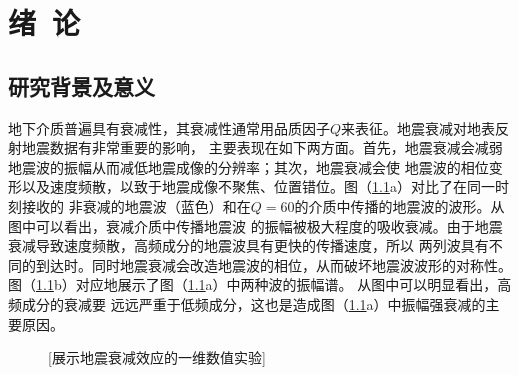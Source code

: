 


\newcommand{\citeA}[2]{\citeauthor{#1}\cite{#1}}

\chapter{绪~论}

\section{研究背景及意义}
地下介质普遍具有衰减性，其衰减性通常用品质因子$Q$来表征。地震衰减对地表反射地震数据有非常重要的影响，
主要表现在如下两方面。首先，地震衰减会减弱地震波的振幅从而减低地震成像的分辨率；其次，地震衰减会使
地震波的相位变形以及速度频散，以致于地震成像不聚焦、位置错位。图（\ref{fig:spectral}a）对比了在同一时刻接收的
非衰减的地震波（蓝色）和在$Q=60$的介质中传播的地震波的波形。从图中可以看出，衰减介质中传播地震波
的振幅被极大程度的吸收衰减。由于地震衰减导致速度频散，高频成分的地震波具有更快的传播速度，所以
两列波具有不同的到达时。同时地震衰减会改造地震波的相位，从而破坏地震波波形的对称性。
图（\ref{fig:spectral}b）对应地展示了图（\ref{fig:spectral}a）中两种波的振幅谱。
从图中可以明显看出，高频成分的衰减要
远远严重于低频成分，这也是造成图（\ref{fig:spectral}a）中振幅强衰减的主要原因。

\begin{figure}[!htbp]
        \centering
        [展示地震衰减效应的一维数值实验]
        \label{fig:spectral}
\end{figure}

